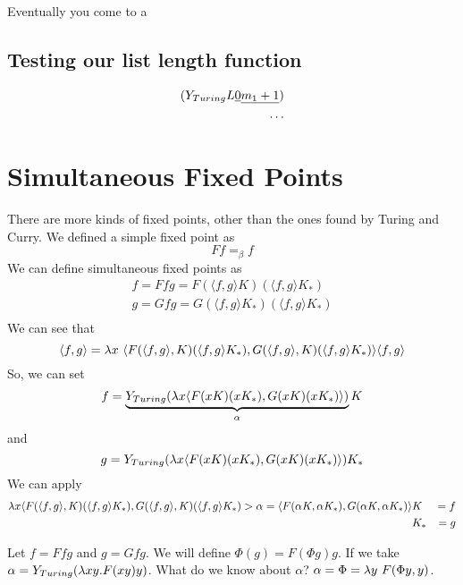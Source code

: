 Eventually you come to a 

\subsection{Testing our list length function}
\begin{eqnarray*}
  (Y_{Turing}L\uline{0} \uline{m_1+1})\\
  \ldots %
\end{eqnarray*}

\section{Simultaneous Fixed Points}
There are more kinds of fixed points, other than the ones found by Turing and Curry. We defined a simple fixed point as
\begin{equation*}
  Ff =_\beta f
\end{equation*}
We can define simultaneous fixed points as
\begin{eqnarray*}
  f = Ffg = F(\langle f,g\rangle K)(\langle f,g \rangle K_*)\\
  g = Gfg = G(\langle f,g\rangle K_*)(\langle f,g\rangle K_*)\\
\end{eqnarray*}
We can see that
\begin{equation*}
  \langle f,g\rangle = \lambda x\ \langle F(\langle f,g\rangle ,K)(\langle f,g\rangle K_*),G(\langle f,g\rangle ,K)(\langle f,g\rangle K_*)\rangle \langle f,g\rangle
\end{equation*}
So, we can set
\begin{equation*}
  f = \underbrace{Y_{Turing} (\lambda x \langle F(xK)(xK_*),G(xK)(xK_*)\rangle )}_{\alpha}K
\end{equation*}
and
\begin{equation*}
  g = Y_{Turing} (\lambda x \langle F(xK)(xK_*),G(xK)(xK_*)\rangle)K_*
\end{equation*}
We can apply
\begin{eqnarray*}
  \lambda x \langle F(\langle f,g\rangle,K)(\langle f,g\rangle K_*),G(\langle f,g\rangle,K)(\langle f,g\rangle K_*)> \alpha = \langle F(\alpha K,\alpha K_*), G(\alpha K, \alpha K_*)\rangle &K& = f\\
&K_*& = g
\end{eqnarray*}

Let $f = Ffg$ and $g = Gfg$. We will define $\Phi(g) = F(\Phi g)g$. If we take $\alpha = Y_{Turing}(\lambda xy . F(xy)y)$. What do we know about $\alpha$? $\alpha = \Phi = \lambda y\ F(\Phi y,y)$.\\

